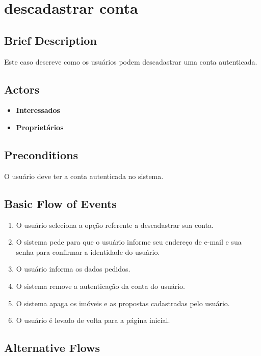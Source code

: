 \section{descadastrar conta}

\subsection*{Brief Description}

Este caso descreve como os usuários podem descadastrar uma conta autenticada.
\subsection*{Actors}

\begin{itemize}
    \item \textbf{Interessados}
    \item \textbf{Proprietários}
\end{itemize}

\subsection*{Preconditions}
O usuário deve ter a conta autenticada no sistema.

\subsection*{Basic Flow of Events}

\begin{enumerate}
    \item  O usuário seleciona a opção referente a descadastrar sua conta.
    \item O sistema pede para que o usuário informe seu endereço de e-mail e sua senha para
    confirmar a identidade do usuário.
    \item O usuário informa os dados pedidos.
    \item O sistema remove a autenticação da conta do usuário.
    \item O sistema apaga os imóveis e as propostas cadastradas pelo usuário.
    \item O usuário é levado de volta para a página inicial.
\end{enumerate}

\subsection*{Alternative Flows}

